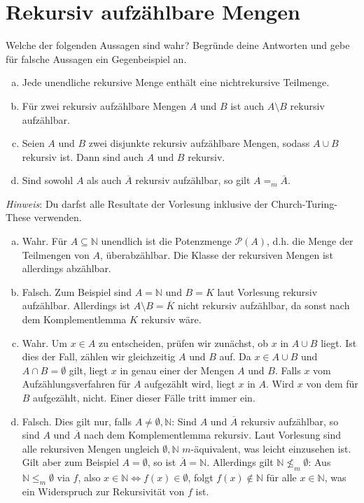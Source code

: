 \documentclass[german,headsepline]{scrartcl}
\theoremstyle{definition}
\begin{document}
	\section{Rekursiv aufzählbare Mengen}
	\begin{question}
		Welche der folgenden Aussagen sind wahr?
		Begründe deine Antworten und gebe für falsche Aussagen ein Gegenbeispiel an.
		\begin{enumerate}[(a)]
			\item Jede unendliche rekursive Menge enthält eine nichtrekursive Teilmenge.
			\item Für zwei rekursiv aufzählbare Mengen $A$ und $B$ ist auch $A\setminus B$ rekursiv aufzählbar.
			\item Seien $A$ und $B$ zwei disjunkte rekursiv aufzählbare Mengen, sodass $A\cup B$ rekursiv ist.
			Dann sind auch $A$ und $B$ rekursiv.
			\item Sind sowohl $A$ als auch $\overline{A}$ rekursiv aufzählbar, so gilt $A=_m\overline{A}$.
		\end{enumerate}
		\textit{Hinweis}: Du darfst alle Resultate der Vorlesung inklusive der Church-Turing-These verwenden.
	\end{question}
	\begin{solution}
		\begin{enumerate}[(a)]
			\item Wahr. Für $A\subseteq\mathbb{N}$ unendlich ist die Potenzmenge $\mathcal{P}(A)$,
				d.h. die Menge der Teilmengen von $A$, überabzählbar.
				Die Klasse der rekursiven Mengen ist allerdings abzählbar.
			\item Falsch. Zum Beispiel sind $A=\mathbb{N}$ und $B=K$ laut Vorlesung rekursiv aufzählbar.
				Allerdings ist $A\setminus B=\overline{K}$ nicht rekursiv aufzählbar,
			da sonst nach dem Komplementlemma $K$ rekursiv wäre.
			\item Wahr. Um $x\in A$ zu entscheiden, prüfen wir zunächst, ob $x$ in $A\cup B$ liegt.
				Ist dies der Fall, zählen wir gleichzeitig $A$ und $B$ auf.
				Da $x\in A\cup B$ und $A\cap B=\emptyset$ gilt, liegt $x$ in genau einer der Mengen $A$ und $B$.
				Falls $x$ vom Aufzählungsverfahren für $A$ aufgezählt wird, liegt $x$ in $A$.
				Wird $x$ von dem für $B$ aufgezählt, nicht. Einer dieser Fälle tritt immer ein.
			\item Falsch. Dies gilt nur, falls $A\neq\emptyset,\mathbb{N}$:
				Sind $A$ und $\overline{A}$ rekursiv aufzählbar,
				so sind $A$ und $\overline{A}$ nach dem Komplementlemma rekursiv.
				Laut Vorlesung sind alle rekursiven Mengen ungleich $\emptyset,\mathbb{N}$ $m$-äquivalent,
				was leicht einzusehen ist. \\
				Gilt aber zum Beispiel $A=\emptyset$, so ist $\overline{A}=\mathbb{N}$.
				Allerdings gilt $\mathbb{N}\not\leq_m\emptyset$:
				Aus $\mathbb{N}\leq_m\emptyset$ via $f$, also $x\in\mathbb{N}\Leftrightarrow f(x)\in\emptyset$,
				folgt $f(x)\not\in\mathbb{N}$ für alle $x\in\mathbb{N}$,
				was ein Widerspruch zur Rekursivität von $f$ ist.
		\end{enumerate}
	\end{solution}
	
\end{document}
